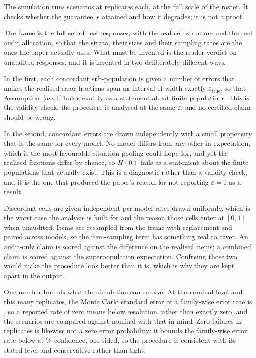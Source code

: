 The simulation runs \SimScenarios{} scenarios at \SimReplicates{} replicates each, at the full
scale of the roster. It checks whether the guarantee is attained and how it degrades; it is not
a proof.

The frame is the full set of real responses, with the real cell structure and the real audit allocation, so
that the strata, their sizes and their sampling rates are the ones the paper actually uses.
What must be invented is the reader verdict on unaudited responses, and it is invented in two
deliberately different ways.

In the first, each concordant sub-population is given a number of errors that makes the
realised error fractions span an interval of width exactly $\varepsilon_{\mathrm{true}}$, so
that Assumption~\ref{ass:h} holds exactly as a statement about finite populations. This is the
validity check: the procedure is analysed at the same $\varepsilon$, and no certified claim
should be wrong.

In the second, concordant errors are drawn independently with a small propensity that is the
same for every model. No model differs from any other in expectation, which is the most
favourable situation pooling could hope for, and yet the realised fractions differ by chance,
so $H(0)$ fails as a statement about the finite populations that actually exist. This is a
diagnostic rather than a validity check, and it is the one that produced the paper's reason
for not reporting $\varepsilon = 0$ as a result.

Discordant cells are given independent per-model rates drawn uniformly, which is the worst
case the analysis is built for and the reason those cells enter at $[0,1]$ when unaudited.
Items are resampled from the frame with replacement and paired across models, so the
item-sampling term has something real to cover. An audit-only claim is scored against the
difference on the realised items; a combined claim is scored against the superpopulation
expectation. Confusing those two would make the procedure look better than it is, which is why
they are kept apart in the output.

One number bounds what the simulation can resolve. At the nominal level and this many
replicates, the Monte Carlo standard error of a family-wise error rate is \SimMcSeAudit{}, so
a reported rate of zero means below resolution rather than exactly zero, and the scenarios are
compared against nominal with that in mind. Zero failures in \SimReplicates{} replicates is
likewise not a zero error probability: it bounds the family-wise error rate below
\SimZeroFwerUpper{} at \SimZeroFwerConfPct\% confidence, one-sided, so the procedure is
consistent with its stated level and conservative rather than tight.

